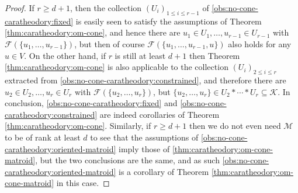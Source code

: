 \documentclass[a4paper,11pt,reqno, english]{amsart}
\theoremstyle{definition}
\theoremstyle{remark}
\begin{document}
\begin{proof}
    If $r\geq d+1$, then the collection $(U_i)_{1\leq i\leq r-1}$ of \ref{obs:no-cone-caratheodory:fixed} is easily seen to satisfy the assumptions of Theorem \ref{thm:caratheodory:om-cone}, and hence there are $u_1\in U_1,\ldots,u_{r-1}\in U_{r-1}$ with $\mathcal{F}(\{u_1,\ldots,u_{r-1}\})$, but then of course $\mathcal{F}(\{u_1,\ldots,u_{r-1},u\})$ also holds for any $u\in V$. On the other hand, if $r$ is still at least $d+1$ then Theorem \ref{thm:caratheodory:om-cone} is also applicable to the collection $(U_i)_{2\leq i\leq r}$ extracted from \ref{obs:no-cone-caratheodory:constrained}, and therefore there are $u_2\in U_2,\ldots,u_r\in U_r$ with $\mathcal{F}(\{u_2,\ldots,u_r\})$, but $\{u_2,\ldots,u_r\}\in U_2*\cdots*U_r\subseteq\mathscr{K}$. In conclusion, \ref{obs:no-cone-caratheodory:fixed} and \ref{obs:no-cone-caratheodory:constrained} are indeed corollaries of Theorem \ref{thm:caratheodory:om-cone}. Similarly, if $r\geq d+1$ then we do not even need $\mathscr{M}$ to be of rank at least $d$ to see that the assumptions of \ref{obs:no-cone-caratheodory:oriented-matroid} imply those of \ref{thm:caratheodory:om-cone-matroid}, but the two conclusions are the same, and as such \ref{obs:no-cone-caratheodory:oriented-matroid} is a corollary of Theorem \ref{thm:caratheodory:om-cone-matroid} in this case.
    

\end{proof}
\end{document}
